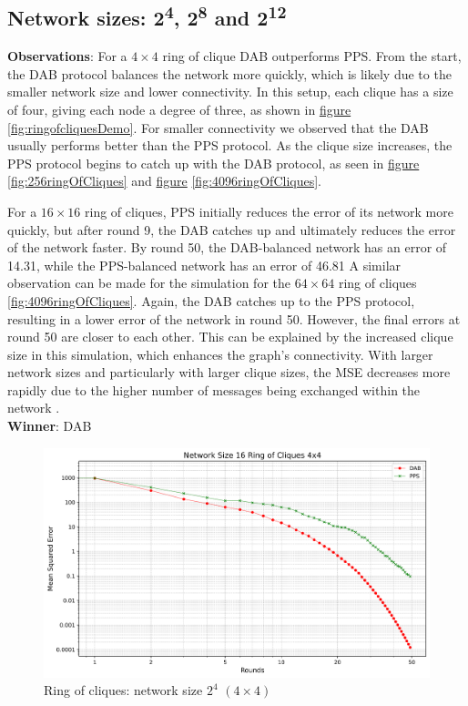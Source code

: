 \subsection{Network sizes: 2\textsuperscript{4}, 2\textsuperscript{8} and 2\textsuperscript{12}}
\textbf{Observations}: For a $4\times4$ ring of clique DAB outperforms PPS. From the start, the DAB protocol balances the network more quickly, which is likely due to the smaller network size and lower connectivity. In this setup, each clique has a size of four, giving each node a degree of three, as shown in \hyperref[fig:ringofcliquesDemo]{figure} \ref{fig:ringofcliquesDemo}. For smaller connectivity we observed that the DAB usually performs better than the PPS protocol. As the clique size increases, the PPS protocol begins to catch up with the DAB protocol, as seen in \hyperref[fig:256ringOfCliques]{figure} \ref{fig:256ringOfCliques} and \hyperref[fig:4096ringOfCliques]{figure} \ref{fig:4096ringOfCliques}.

For a $16\times16$ ring of cliques, PPS initially reduces the error of its network more quickly, but after round 9, the DAB catches up and ultimately reduces the error of the network faster. By round 50, the DAB-balanced network has an error of 14.31, while the PPS-balanced network has an error of 46.81 A similar observation can be made for the simulation for the $64 \times 64$ ring of cliques \ref{fig:4096ringOfCliques}. Again, the DAB catches up to the PPS protocol, resulting in a lower error of the network in round 50. However, the final errors at round 50 are closer to each other. This can be explained by the increased clique size in this simulation, which enhances the graph's connectivity. With larger network sizes and particularly with larger clique sizes, the MSE decreases more rapidly due to the higher number of messages being exchanged within the network \cite{nugroho2023PushPullSumDataAg}.\\
\textbf{Winner}: DAB
\begin{figure}[H]
    \centering
    \includegraphics[scale=0.5]{figures/ringOfCliquesSimulations/DAB_vs_PPS_RoC_r50_n16.png}
    \caption{Ring of cliques: network size $2^{4}$ $(4\times4)$}
    \label{fig:16ringOfCliques}
\end{figure}

